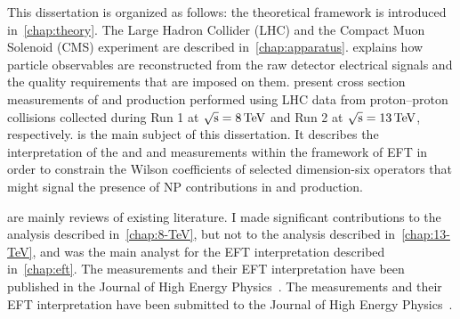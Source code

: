 This dissertation is organized as follows: the theoretical framework is introduced
in~\cref{chap:theory}. The Large Hadron Collider (LHC) and the Compact Muon
Solenoid (CMS) experiment are described in~\cref{chap:apparatus}.
 explains how particle observables are reconstructed from the
raw detector electrical signals and the quality requirements that are imposed on
them.  present cross section measurements of \ttW
and \ttZ production performed using LHC data from proton--proton collisions
collected during Run 1 at $\sqrt{\text{s}}=\SI{8}{TeV}$ and Run 2 at
$\sqrt{\text{s}}=\SI{13}{TeV}$, respectively.  is the main
subject of this dissertation. It describes the interpretation of the \eightTeV and
\thirteenTeV \ttW and \ttZ measurements within the framework of EFT in order to
constrain the Wilson coefficients of selected dimension-six operators that might
signal the presence of NP contributions in \ttW and \ttZ production.

 are mainly reviews of
existing literature. I made significant contributions to the analysis described
in~\cref{chap:8-TeV}, but not to the analysis described in~\cref{chap:13-TeV},
and was the main analyst for the EFT interpretation described
in~\cref{chap:eft}. The \eightTeV measurements and their EFT interpretation have
been published in the Journal of High Energy Physics~\cite{JHEP-1601-2016-096}.
The \thirteenTeV measurements and their EFT interpretation have been submitted
to the Journal of High Energy Physics~\cite{TOP-17-005}.
